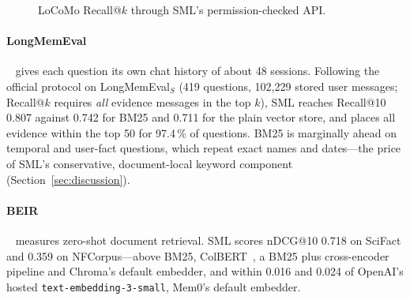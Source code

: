 \documentclass[11pt,a4paper]{article}
\theoremstyle{remark}
\newcommand{\sys}{SML}
\begin{document}
\begin{figure}[htbp]
\centering
{}
\caption{LoCoMo Recall@$k$ through \sys{}'s permission-checked API.}
\label{fig:locomo}
\end{figure}

\paragraph{LongMemEval}~\cite{wu2025longmemeval} gives each question its own chat history of about 48 sessions. Following
the official protocol on LongMemEval$_S$ (419 questions, 102{,}229 stored user messages; Recall@$k$ requires \emph{all}
evidence messages in the top $k$), \sys{} reaches Recall@10 0.807 against 0.742 for BM25 and 0.711 for the plain vector
store, and places all evidence within the top 50 for 97.4\,\% of questions. BM25 is marginally ahead on temporal and
user-fact questions, which repeat exact names and dates---the price of \sys{}'s conservative, document-local keyword
component (Section~\ref{sec:discussion}).

\begin{sloppypar}
\paragraph{BEIR}~\cite{thakur2021beir} measures zero-shot document retrieval. \sys{} scores nDCG@10 0.718 on SciFact and
0.359 on NFCorpus---above BM25, ColBERT~\cite{khattab2020colbert}, a BM25 plus cross-encoder pipeline and Chroma's default
embedder, and within 0.016 and 0.024 of OpenAI's hosted \texttt{text-embedding-3-small}, Mem0's default embedder.
\end{sloppypar}
\end{document}

